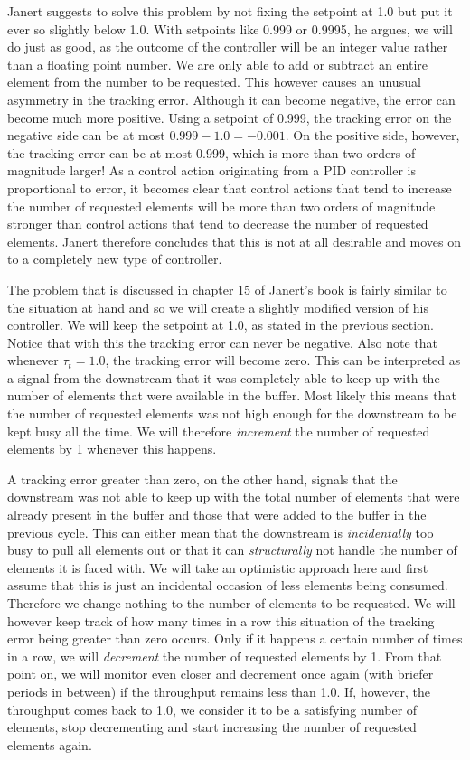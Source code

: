 Janert suggests to solve this problem by not fixing the setpoint at 1.0 but put it ever so slightly below 1.0. With setpoints like 0.999 or 0.9995, he argues, we will do just as good, as the outcome of the controller will be an integer value rather than a floating point number. We are only able to add or subtract an entire element from the number to be requested. This however causes an unusual asymmetry in the tracking error. Although it can become negative, the error can become much more positive. Using a setpoint of 0.999, the tracking error on the negative side can be at most $0.999 - 1.0 = -0.001$. On the positive side, however, the tracking error can be at most 0.999, which is more than two orders of magnitude larger! As a control action originating from a PID controller is proportional to error, it becomes clear that control actions that tend to increase the number of requested elements will be more than two orders of magnitude stronger than control actions that tend to decrease the number of requested elements. Janert therefore concludes that this is not at all desirable and moves on to a completely new type of controller.

The problem that is discussed in chapter 15 of Janert's book is fairly similar to the situation at hand and so we will create a slightly modified version of his controller. We will keep the setpoint at 1.0, as stated in the previous section. Notice that with this the tracking error can never be negative. Also note that whenever $\tau_t = 1.0$, the tracking error will become zero. This can be interpreted as a signal from the downstream that it was completely able to keep up with the number of elements that were available in the buffer. Most likely this means that the number of requested elements was not high enough for the downstream to be kept busy all the time. We will therefore \textit{increment} the number of requested elements by 1 whenever this happens.

A tracking error greater than zero, on the other hand, signals that the downstream was not able to keep up with the total number of elements that were already present in the buffer and those that were added to the buffer in the previous cycle. This can either mean that the downstream is \emph{incidentally} too busy to pull all elements out or that it can \emph{structurally} not handle the number of elements it is faced with. We will take an optimistic approach here and first assume that this is just an incidental occasion of less elements being consumed. Therefore we change nothing to the number of elements to be requested. We will however keep track of how many times in a row this situation of the tracking error being greater than zero occurs. Only if it happens a certain number of times in a row, we will \textit{decrement} the number of requested elements by 1. From that point on, we will monitor even closer and decrement once again (with briefer periods in between) if the throughput remains less than 1.0. If, however, the throughput comes back to 1.0, we consider it to be a satisfying number of elements, stop decrementing and start increasing the number of requested elements again.

